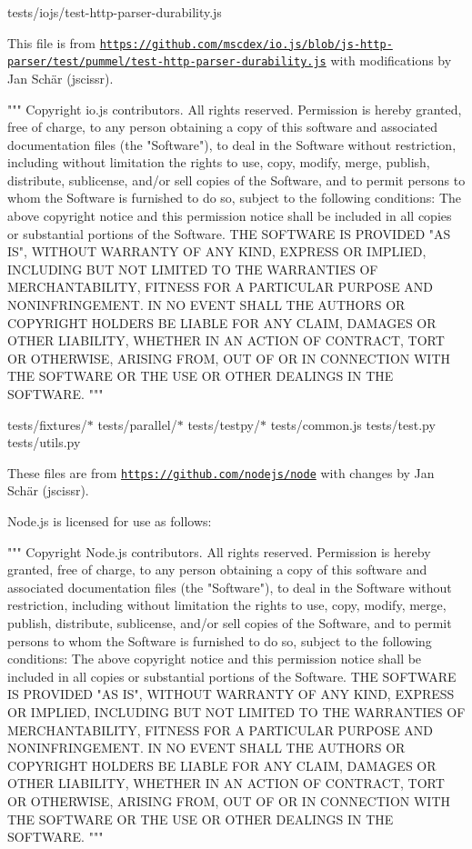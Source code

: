 \begin{DoxyItemize}
\item tests/iojs/test-\/http-\/parser-\/durability.\+js

This file is from \href{https://github.com/mscdex/io.js/blob/js-http-parser/test/pummel/test-http-parser-durability.js}{\texttt{https\+://github.\+com/mscdex/io.\+js/blob/js-\/http-\/parser/test/pummel/test-\/http-\/parser-\/durability.\+js}} with modifications by Jan Schär (jscissr).

"{}"{}"{}   Copyright io.\+js contributors. All rights reserved.    Permission is hereby granted, free of charge, to any person obtaining a copy   of this software and associated documentation files (the "{}Software"{}), to   deal in the Software without restriction, including without limitation the   rights to use, copy, modify, merge, publish, distribute, sublicense, and/or   sell copies of the Software, and to permit persons to whom the Software is   furnished to do so, subject to the following conditions\+:    The above copyright notice and this permission notice shall be included in   all copies or substantial portions of the Software.    THE SOFTWARE IS PROVIDED "{}AS IS"{}, WITHOUT WARRANTY OF ANY KIND, EXPRESS OR   IMPLIED, INCLUDING BUT NOT LIMITED TO THE WARRANTIES OF MERCHANTABILITY,   FITNESS FOR A PARTICULAR PURPOSE AND NONINFRINGEMENT. IN NO EVENT SHALL THE   AUTHORS OR COPYRIGHT HOLDERS BE LIABLE FOR ANY CLAIM, DAMAGES OR OTHER   LIABILITY, WHETHER IN AN ACTION OF CONTRACT, TORT OR OTHERWISE, ARISING   FROM, OUT OF OR IN CONNECTION WITH THE SOFTWARE OR THE USE OR OTHER DEALINGS   IN THE SOFTWARE.   "{}"{}"{}
\item tests/fixtures/\texorpdfstring{$\ast$}{*} tests/parallel/\texorpdfstring{$\ast$}{*} tests/testpy/\texorpdfstring{$\ast$}{*} tests/common.\+js tests/test.\+py tests/utils.\+py

These files are from \href{https://github.com/nodejs/node}{\texttt{https\+://github.\+com/nodejs/node}} with changes by Jan Schär (jscissr).

Node.\+js is licensed for use as follows\+:

"{}"{}"{}   Copyright Node.\+js contributors. All rights reserved.    Permission is hereby granted, free of charge, to any person obtaining a copy   of this software and associated documentation files (the "{}Software"{}), to   deal in the Software without restriction, including without limitation the   rights to use, copy, modify, merge, publish, distribute, sublicense, and/or   sell copies of the Software, and to permit persons to whom the Software is   furnished to do so, subject to the following conditions\+:    The above copyright notice and this permission notice shall be included in   all copies or substantial portions of the Software.    THE SOFTWARE IS PROVIDED "{}AS IS"{}, WITHOUT WARRANTY OF ANY KIND, EXPRESS OR   IMPLIED, INCLUDING BUT NOT LIMITED TO THE WARRANTIES OF MERCHANTABILITY,   FITNESS FOR A PARTICULAR PURPOSE AND NONINFRINGEMENT. IN NO EVENT SHALL THE   AUTHORS OR COPYRIGHT HOLDERS BE LIABLE FOR ANY CLAIM, DAMAGES OR OTHER   LIABILITY, WHETHER IN AN ACTION OF CONTRACT, TORT OR OTHERWISE, ARISING   FROM, OUT OF OR IN CONNECTION WITH THE SOFTWARE OR THE USE OR OTHER DEALINGS   IN THE SOFTWARE.   "{}"{}"{}


\end{DoxyItemize}
